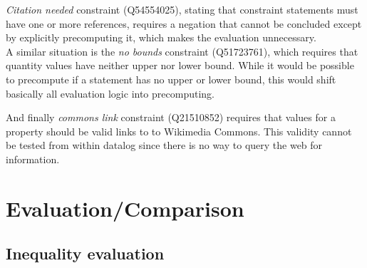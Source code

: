 \documentclass[hyperref,bachelorofscience,fleqn]{cgvpub}
\begin{document}
\emph{Citation needed} constraint (Q54554025), stating that constraint statements must have one or more references, requires a negation that cannot be concluded except by explicitly precomputing it, which makes the evaluation unnecessary. \\
A similar situation is the \emph{no bounds} constraint (Q51723761), which requires that quantity values have neither upper nor lower bound. While it would be possible to precompute if a statement has no upper or lower bound, this would shift basically all evaluation logic into precomputing.

And finally \emph{commons link} constraint (Q21510852) requires that values for a property should be valid links to to Wikimedia Commons. This validity cannot be tested from within datalog since there is no way to query the web for information.

\chapter{Evaluation/Comparison}

\section{Inequality evaluation}\label{sec_inequality_evaluation}
\end{document}
